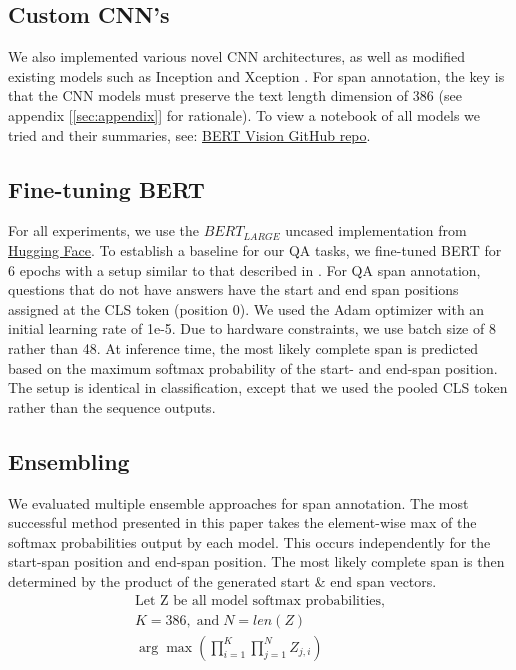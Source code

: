 \subsection{Custom CNN's}

We also implemented various novel CNN architectures, as well as modified existing models such as Inception and Xception \citep{DBLP:journals/corr/SzegedyLJSRAEVR14, DBLP:journals/corr/Chollet16a}. For span annotation, the key is that the CNN models must preserve the text length dimension of 386 (see appendix [\ref{sec:appendix}] for rationale). To view a notebook of all models we tried and their summaries, see: \href{https://github.com/cbenge509/BERTVision}{BERT Vision GitHub repo}.

\subsection{Fine-tuning BERT}

For all experiments, we use the $BERT_{LARGE}$ uncased implementation from \href{https://huggingface.co/}{Hugging Face}. To establish a baseline for our QA tasks, we fine-tuned BERT for 6 epochs with a setup similar to that described in \cite{Devlin2019}. For QA span annotation, questions that do not have answers have the start and end span positions assigned at the CLS token (position 0). We used the Adam optimizer with an initial learning rate of 1e-5. Due to hardware constraints, we use batch size of 8 rather than 48. At inference time, the most likely complete span is predicted based on the maximum softmax probability of the start- and end-span position. The setup is identical in classification, except that we used the pooled CLS token rather than the sequence outputs.

\subsection{Ensembling} 

We evaluated multiple ensemble approaches for span annotation. The most successful method presented in this paper takes the element-wise max of the softmax probabilities output by each model. This occurs independently for the start-span position and end-span position. The most likely complete span is then determined by the product of the generated start \& end span vectors.
\begin{equation} \label{eq2}
\begin{aligned}
\text{Let Z be all model softmax probabilities}, \\
K = 386,\;\text{and}\;N = len(Z) \\
\arg\max\left(\prod_{i=1}^{K}{\prod_{j=1}^{N}{Z_{j,i}}}\right)
\end{aligned}
\end{equation}

